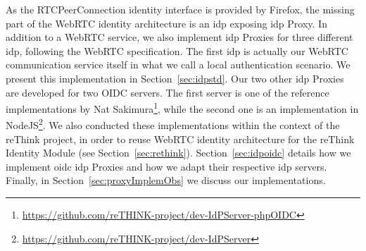 As the RTCPeerConnection identity interface is provided by Firefox, the missing part of the WebRTC identity architecture is an \gls{idp} exposing \gls{idp} Proxy.
In addition to a WebRTC service, we also implement \gls{idp} Proxies for three different \gls{idp}, following the WebRTC specification.
The first \gls{idp} is actually our WebRTC communication service itself in what we call a local authentication scenario.
We present this implementation in Section~\ref{sec:idpstd}.
Our two other \gls{idp} Proxies are developed for two OIDC servers.
The first server is one of the reference implementations by Nat Sakimura\footnote{\url{https://github.com/reTHINK-project/dev-IdPServer-phpOIDC}}, while the second one is an implementation in NodeJS\footnote{\url{https://github.com/reTHINK-project/dev-IdPServer}}.
We also conducted these implementations within the context of the reThink project, in order to reuse WebRTC identity architecture for the reThink Identity Module (see Section~\ref{sec:rethink}).
Section~\ref{sec:idpoidc} details how we implement \gls{oidc} \gls{idp} Proxies and how we adapt their respective \gls{idp} servers.
Finally, in Section~\ref{sec:proxyImplemObs} we discuss our implementations.

